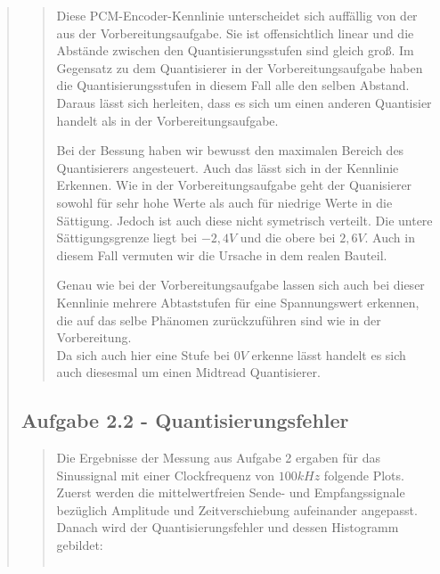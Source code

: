 \begin{quote}
\begin{quote}
        Diese PCM-Encoder-Kennlinie unterscheidet sich auffällig von der aus der Vorbereitungsaufgabe.
        Sie ist offensichtlich linear und die Abstände zwischen den Quantisierungsstufen sind gleich groß. Im Gegensatz
        zu dem Quantisierer in der Vorbereitungsaufgabe haben die Quantisierungsstufen in diesem Fall alle den selben
        Abstand. Daraus lässt sich herleiten, dass es sich um einen anderen Quantisier handelt als in der
        Vorbereitungsaufgabe.\vspace{1em}
        
        Bei der Bessung haben wir bewusst den maximalen Bereich des Quantisierers angesteuert. Auch das lässt sich in
        der Kennlinie Erkennen. Wie in der Vorbereitungsaufgabe geht der Quanisierer sowohl für sehr hohe Werte als auch
        für niedrige Werte in die Sättigung. Jedoch ist auch diese nicht symetrisch verteilt. Die untere
        Sättigungsgrenze liegt bei $-2,4 V$ und die obere bei $2,6 V$. Auch in diesem Fall vermuten wir die Ursache in
        dem realen Bauteil.\vspace{1em}
        
        Genau wie bei der Vorbereitungsaufgabe lassen sich auch bei dieser Kennlinie mehrere Abtaststufen für eine
        Spannungswert erkennen, die auf das selbe Phänomen zurückzuführen sind wie in der Vorbereitung.\\
        Da sich auch hier eine Stufe bei $0 V$ erkenne lässt handelt es sich auch diesesmal um einen Midtread
        Quantisierer.\vspace{1em}
        
        
    \end{quote}  %
    
    \subsection{Aufgabe 2.2 - Quantisierungsfehler}
    \begin{quote}
        Die Ergebnisse der Messung aus Aufgabe 2 ergaben für das Sinussignal mit
        einer Clockfrequenz von $100 kHz$ folgende Plots. Zuerst werden die
        mittelwertfreien Sende- und Empfangssignale bezüglich Amplitude und
        Zeitverschiebung aufeinander angepasst. Danach wird der
        Quantisierungsfehler und dessen Histogramm gebildet:
        \begin{center}
            \begin{tabular}{ll}
            

\end{tabular}
\end{center}
\end{quote}
\end{quote}
